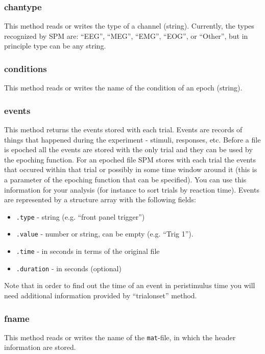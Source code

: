 \subsubsection{chantype}
This method reads or writes the type of a channel (string). Currently, the types recognized by SPM are: ``EEG'', ``MEG'', ``EMG'', ``EOG'', or ``Other'', but in principle type can be any string.

\subsubsection{conditions}
This method  reads or writes the name of the condition of an epoch (string).

\subsubsection{events}
This method returns the events stored with each trial. Events are records of things that happened during the experiment - stimuli, responses, etc. Before a file is epoched all the events are stored with the only trial and they can be used by the epoching function. For an epoched file SPM stores with each trial the events that occured within that trial or possibly in some time window around it (this is a parameter of the epoching function that can be specified). You can use this information for your analysis (for instance to sort trials by reaction time). Events are represented by a structure array with the following fields:

\begin{itemize}
\item \texttt{.type} - string (e.g. ``front panel trigger'')
\item \texttt{.value} - number or string, can be empty (e.g. ``Trig 1'').
\item \texttt{.time} - in seconds in terms of the original file
\item \texttt{.duration} - in seconds (optional)
\end{itemize}

Note that in order to find out the time of an event in peristimulus time you will need additional information provided by ``trialonset'' method.

\subsubsection{fname}
This method reads or writes the name of the \texttt{mat}-file, in which the header information are stored.

